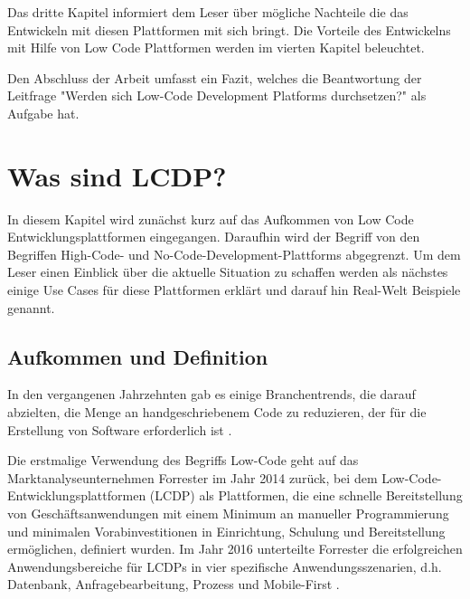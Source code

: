 \documentclass[12pt]{article} %
\begin{document}
	Das dritte Kapitel informiert dem Leser über mögliche Nachteile die das Entwickeln mit diesen Plattformen mit sich bringt. 
	Die Vorteile des Entwickelns mit Hilfe von Low Code Plattformen werden im vierten Kapitel beleuchtet. \newline
	
	
	Den Abschluss der Arbeit umfasst ein Fazit, welches die Beantwortung der Leitfrage "Werden sich Low-Code Development Platforms durchsetzen?" als Aufgabe hat. 
	
	
	\section{Was sind LCDP?}
	In diesem Kapitel wird zunächst kurz auf das Aufkommen von Low Code Entwicklungsplattformen eingegangen. Daraufhin wird der Begriff von den Begriffen High-Code- und No-Code-Development-Plattforms abgegrenzt. Um dem Leser einen Einblick über die aktuelle Situation zu schaffen werden als nächstes einige Use Cases für diese Plattformen erklärt und darauf hin Real-Welt Beispiele genannt. 
	
	\subsection{Aufkommen und Definition}		
	In den vergangenen Jahrzehnten gab es einige Branchentrends, die darauf abzielten, die Menge an handgeschriebenem Code zu reduzieren, der für die Erstellung von Software erforderlich ist \cite{DiRuscio.2022}. \newline
	
	Die erstmalige Verwendung des Begriffs Low-Code geht auf das Marktanalyseunternehmen Forrester im Jahr 2014 zurück, bei dem Low-Code-Entwicklungsplattformen (LCDP) als Plattformen, die eine schnelle Bereitstellung von Geschäftsanwendungen mit einem Minimum an manueller Programmierung und minimalen Vorabinvestitionen in Einrichtung, Schulung und Bereitstellung ermöglichen, definiert wurden. 
	Im Jahr 2016 unterteilte Forrester die erfolgreichen Anwendungsbereiche für LCDPs in vier spezifische Anwendungsszenarien, d.h. Datenbank, Anfragebearbeitung, Prozess und Mobile-First \cite{DiRuscio.2022}. \newline %
	
\end{document}
